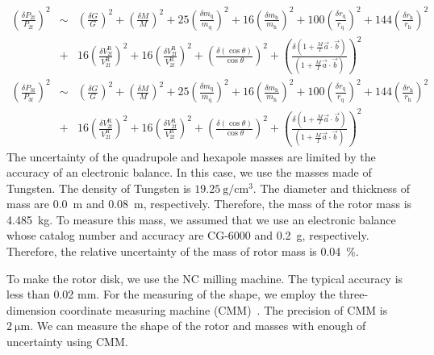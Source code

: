 \documentclass[A4]{spie}  %
\begin{document}
\begin{eqnarray}
\left( \frac{\delta P_{\mathrm{2f}}}{P_{\mathrm{2f}}} \right)^2 &\sim& \left( \frac{\delta G}{G} \right)^2 + \left( \frac{\delta M}{M} \right)^2+25\left( \frac{\delta m_{\mathrm{q}}}{m_{\mathrm{q}}} \right)^2+16\left( \frac{\delta m_{\mathrm{h}}}{m_{\mathrm{h}}} \right)^2 +100\left( \frac{\delta r_{\mathrm{q}}}{r_{\mathrm{q}}} \right)^2+144\left( \frac{\delta r_{\mathrm{h}}}{r_{\mathrm{h}}} \right)^2 \nonumber \\
&+&16\left( \frac{\delta V^{\mathrm{R}}_{{\mathrm{2f}}}}{V^{\mathrm{R}}_{{\mathrm{2f}}}} \right)^2+16\left( \frac{\delta V^{\mathrm{R}}_{{\mathrm{2f}}}}{V^{\mathrm{R}}_{{\mathrm{2f}}}} \right)^2+\left( \frac{\delta (\cos{\theta})}{\cos{\theta}} \right)^2+ \left( \frac{\delta\left( 1+\frac{M}{I}\vec{a}\cdot \vec{b} \right)}{\left( 1+\frac{M}{I}\vec{a}\cdot \vec{b} \right)} \right)^2 \\
\left( \frac{\delta P_{\mathrm{3f}}}{P_{\mathrm{3f}}} \right)^2 &\sim& \left( \frac{\delta G}{G} \right)^2 + \left( \frac{\delta M}{M} \right)^2+25\left( \frac{\delta m_{\mathrm{q}}}{m_{\mathrm{q}}} \right)^2+16\left( \frac{\delta m_{\mathrm{h}}}{m_{\mathrm{h}}} \right)^2 +100\left( \frac{\delta r_{\mathrm{q}}}{r_{\mathrm{q}}} \right)^2+144\left( \frac{\delta r_{\mathrm{h}}}{r_{\mathrm{h}}} \right)^2 \nonumber \\
&+&16\left( \frac{\delta V^{\mathrm{R}}_{{\mathrm{2f}}}}{V^{\mathrm{R}}_{{\mathrm{2f}}}} \right)^2+16\left( \frac{\delta V^{\mathrm{R}}_{{\mathrm{2f}}}}{V^{\mathrm{R}}_{{\mathrm{2f}}}} \right)^2+\left( \frac{\delta (\cos{\theta})}{\cos{\theta}} \right)^2+ \left( \frac{\delta\left( 1+\frac{M}{I}\vec{a}\cdot \vec{b} \right)}{\left( 1+\frac{M}{I}\vec{a}\cdot \vec{b} \right)} \right)^2 
\end{eqnarray}
The uncertainty of the quadrupole and hexapole masses are limited by the accuracy of  an electronic balance. In this case, we use the masses made of Tungsten. The density of Tungsten is $19.25~\mathrm{g/cm^3}$. The diameter and thickness of mass are 0.0~m and 0.08~m, respectively. Therefore, the mass of the rotor mass is 4.485~kg. To measure this mass, we assumed that we use an electronic balance whose catalog number and accuracy are CG-6000 and 0.2~g, respectively. Therefore, the relative uncertainty of the mass of rotor mass is 0.04~\%.

 To make the rotor disk, we use the NC milling machine. The typical accuracy is less than 0.02 mm. For the measuring of the shape, we employ the three-dimension coordinate measuring machine (CMM)~\cite{Inoue:2016kyq}. The precision of CMM is $2~\mathrm{\mu m}$. We can measure the shape of the rotor and masses with enough of uncertainty using CMM. 
\end{document}
